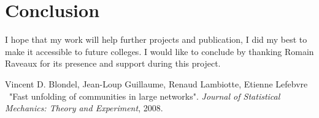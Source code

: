 \documentclass[UTF8, twoside]{EPURapport}
\begin{document}
\chapter{Conclusion}

	\hspace{4ex}I hope that my work will help further projects and publication, I did my best to make it accessible to future colleges. I would like to conclude by thanking Romain Raveaux for its presence and support during this project.

\begin{thebibliography}{99}	
	
{\sc Vincent D. Blondel, Jean-Loup Guillaume, Renaud Lambiotte, Etienne Lefebvre}
{\ "Fast unfolding of communities in large networks"}.
{ \textit{Journal of Statistical Mechanics: Theory and Experiment}, 2008}.

\end{thebibliography}

	
\end{document}
